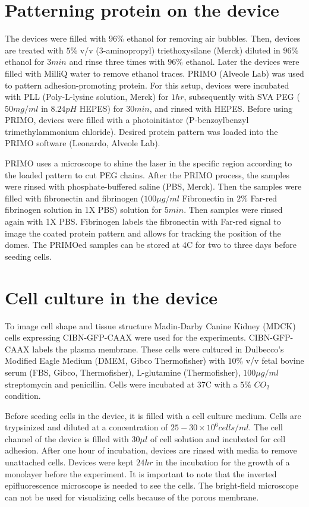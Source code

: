 \section{Patterning protein on the device}
The devices were filled with $96\%$ ethanol for removing air bubbles. Then, devices are treated with $5\%$ v/v (3-aminopropyl) triethoxysilane (Merck) diluted in $96\%$ ethanol for $3min$ and rinse three times with $96\%$ ethanol. Later the devices were filled with MilliQ water to remove ethanol traces. PRIMO (Alveole Lab) was used to pattern adhesion-promoting protein. For this setup, devices were incubated with PLL (Poly-L-lysine solution, Merck) for $1hr$, subsequently with SVA PEG ($50mg/ml$ in $8.24pH$ HEPES) for $30min$, and rinsed with HEPES. Before using PRIMO, devices were filled with a photoinitiator (P-benzoylbenzyl trimethylammonium chloride). Desired protein pattern was loaded into the PRIMO software (Leonardo, Alveole Lab). 

PRIMO uses a microscope to shine the laser in the specific region according to the loaded pattern to cut PEG chains. After the PRIMO process, the samples were rinsed with phosphate-buffered saline (PBS, Merck). Then the samples were filled with fibronectin and fibrinogen ($100\mu g/ml$ Fibronectin in $2\%$ Far-red fibrinogen solution in 1X PBS) solution for $5 min$. Then samples were rinsed again with 1X PBS. Fibrinogen labels the fibronectin with Far-red signal to image the coated protein pattern and allows for tracking the position of the domes. The PRIMOed samples can be stored at 4\textdegree{}C for two to three days before seeding cells.

\section{Cell culture in the device}

To image cell shape and tissue structure Madin-Darby Canine Kidney (MDCK) cells expressing CIBN-GFP-CAAX were used for the experiments. CIBN-GFP-CAAX labels the plasma membrane. These cells were cultured in Dulbecco’s Modified Eagle Medium (DMEM, Gibco Thermofisher) with $10\%$ v/v fetal bovine serum (FBS, Gibco, Thermofisher), L-glutamine (Thermofisher), $100\mu g/ml$ streptomycin and penicillin. Cells were incubated at  37\textdegree{}C with a $5\%$ $CO_2$ condition. 

Before seeding cells in the device, it is filled with a cell culture medium. Cells are trypsinized and diluted at a concentration of $25-30\times10^6 cells/ml$. The cell channel of the device is filled with $30\mu l$ of cell solution and incubated for cell adhesion. After one hour of incubation, devices are rinsed with media to remove unattached cells. Devices were kept $24hr$ in the incubation for the growth of a monolayer before the experiment. It is important to note that the inverted epifluorescence microscope is needed to see the cells. The bright-field microscope can not be used for visualizing cells because of the porous membrane.

